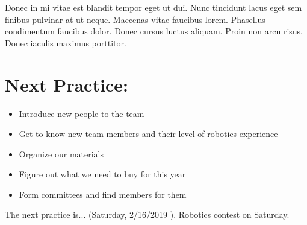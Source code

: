 \documentclass[12pt]{article}
\begin{document}
Donec in mi vitae est blandit tempor eget ut dui. Nunc tincidunt lacus eget sem finibus pulvinar at ut neque. Maecenas vitae faucibus lorem. Phasellus condimentum faucibus dolor. Donec cursus luctus aliquam. Proin non arcu risus. Donec iaculis maximus porttitor.

\section{Next Practice:}
\begin{itemize}
	\item Introduce new people to the team
	\item Get to know new team members and their level of robotics experience
	\item Organize our materials
	\item Figure out what we need to buy for this year
	\item Form committees and find members for them
\end{itemize}

The next practice is... (Saturday, 2/16/2019 ). Robotics contest on Saturday. 
\end{document}
